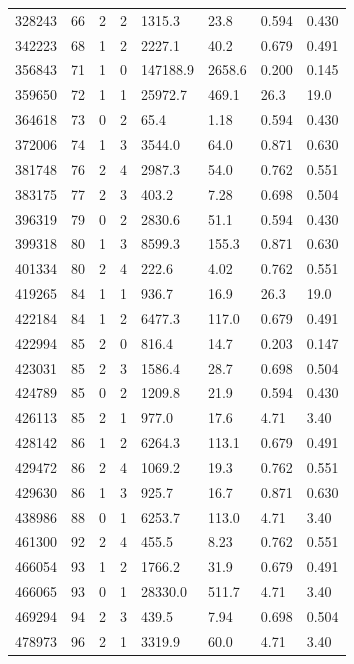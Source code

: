 \documentclass[preview]{standalone}
\begin{document}
{{{\begin{tabular}{L{1.2cm}C{1.2cm} C{0.3cm}C{0.5cm} C{1.4cm}C{1.4cm} C{1.4cm}C{1.4cm}}
  328243  &    66  & 2     &  2 &  1315.3  & 23.8  & 0.594 &  0.430   \\ 
  342223  &    68  & 1     &  2 &  2227.1  & 40.2  & 0.679 &  0.491   \\ 
  356843  &    71  & 1     &  0 &  147188.9  & 2658.6  & 0.200 &  0.145   \\ 
  359650  &    72  & 1     &  1 &  25972.7  & 469.1  & 26.3 &  19.0   \\ 
  364618  &    73  & 0     &  2 &  65.4  & 1.18  & 0.594 &  0.430   \\ 
  372006  &    74  & 1     &  3 &  3544.0  & 64.0  & 0.871 &  0.630   \\ 
  381748  &    76  & 2     &  4 &  2987.3  & 54.0  & 0.762 &  0.551   \\ 
  383175  &    77  & 2     &  3 &  403.2  & 7.28  & 0.698 &  0.504   \\ 
  396319  &    79  & 0     &  2 &  2830.6  & 51.1  & 0.594 &  0.430   \\ 
  399318  &    80  & 1     &  3 &  8599.3  & 155.3  & 0.871 &  0.630   \\ 
  401334  &    80  & 2     &  4 &  222.6  & 4.02  & 0.762 &  0.551   \\ 
  419265  &    84  & 1     &  1 &  936.7  & 16.9  & 26.3 &  19.0   \\ 
  422184  &    84  & 1     &  2 &  6477.3  & 117.0  & 0.679 &  0.491   \\ 
  422994  &    85  & 2     &  0 &  816.4  & 14.7  & 0.203 &  0.147   \\ 
  423031  &    85  & 2     &  3 &  1586.4  & 28.7  & 0.698 &  0.504   \\ 
  424789  &    85  & 0     &  2 &  1209.8  & 21.9  & 0.594 &  0.430   \\ 
  426113  &    85  & 2     &  1 &  977.0  & 17.6  & 4.71 &  3.40   \\ 
  428142  &    86  & 1     &  2 &  6264.3  & 113.1  & 0.679 &  0.491   \\ 
  429472  &    86  & 2     &  4 &  1069.2  & 19.3  & 0.762 &  0.551   \\ 
  429630  &    86  & 1     &  3 &  925.7  & 16.7  & 0.871 &  0.630   \\ 
  438986  &    88  & 0     &  1 &  6253.7  & 113.0  & 4.71 &  3.40   \\ 
  461300  &    92  & 2     &  4 &  455.5  & 8.23  & 0.762 &  0.551   \\ 
  466054  &    93  & 1     &  2 &  1766.2  & 31.9  & 0.679 &  0.491   \\ 
  466065  &    93  & 0     &  1 &  28330.0  & 511.7  & 4.71 &  3.40   \\ 
  469294  &    94  & 2     &  3 &  439.5  & 7.94  & 0.698 &  0.504   \\ 
  478973  &    96  & 2     &  1 &  3319.9  & 60.0  & 4.71 &  3.40   \\ 
\hline 
\end{tabular} 

}}}
\end{document}
